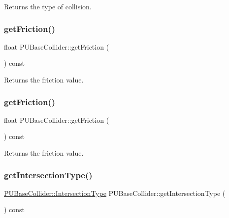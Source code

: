 Returns the type of collision. \mbox{\label{classPUBaseCollider_a1a22cdac4632c10d249b8ad681013ac9}} 
\subsubsection{\texorpdfstring{get\+Friction()}{getFriction()}\hspace{0.1cm}{\footnotesize\ttfamily [1/2]}}
{\footnotesize\ttfamily float P\+U\+Base\+Collider\+::get\+Friction (\begin{DoxyParamCaption}{ }\end{DoxyParamCaption}) const}

Returns the friction value. \mbox{\label{classPUBaseCollider_a1a22cdac4632c10d249b8ad681013ac9}} 
\subsubsection{\texorpdfstring{get\+Friction()}{getFriction()}\hspace{0.1cm}{\footnotesize\ttfamily [2/2]}}
{\footnotesize\ttfamily float P\+U\+Base\+Collider\+::get\+Friction (\begin{DoxyParamCaption}{ }\end{DoxyParamCaption}) const}

Returns the friction value. \mbox{\label{classPUBaseCollider_ac79e93200966f28399abc3ad8e603f26}} 
\subsubsection{\texorpdfstring{get\+Intersection\+Type()}{getIntersectionType()}\hspace{0.1cm}{\footnotesize\ttfamily [1/2]}}
{\footnotesize\ttfamily \hyperlink{classPUBaseCollider_ae86fc81f78c00a88e8e927377a86e81c}{P\+U\+Base\+Collider\+::\+Intersection\+Type} P\+U\+Base\+Collider\+::get\+Intersection\+Type (\begin{DoxyParamCaption}{ }\end{DoxyParamCaption}) const}

